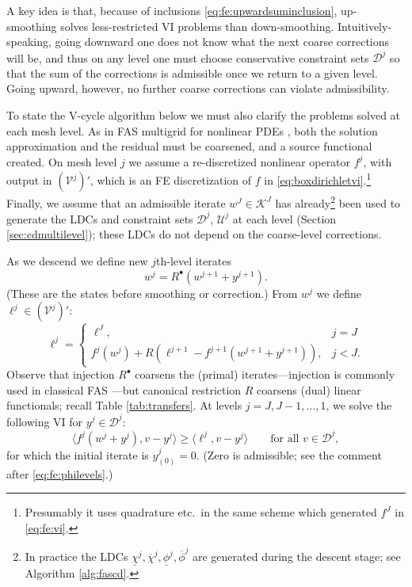 \documentclass[letterpaper,final,12pt,reqno]{amsart}
\theoremstyle{cstyle}
\theoremstyle{cstyle*}
\theoremstyle{dstyle}
\numberwithin{equation}{section}
\numberwithin{figure}{section}
\numberwithin{table}{section}
\numberwithin{theorem}{section}
\newcommand{\cV}{\mathcal{V}}
\newcommand{\ip}[2]{\langle#1,#2\rangle}
\newcommand{\iR}{R^{\bullet}}
\begin{document}
A key idea is that, because of inclusions \eqref{eq:fe:upwardsuminclusion}, up-smoothing solves less-restricted VI problems than down-smoothing.  Intuitively-speaking, going downward one does not know what the next coarse corrections will be, and thus on any level one must choose conservative constraint sets $\mathcal{D}^j$ so that the sum of the corrections is admissible once we return to a given level.  Going upward, however, no further coarse corrections can violate admissibility.

To state the V-cycle algorithm below we must also clarify the problems solved at each mesh level.  As in FAS multigrid for nonlinear PDEs \cite{BrandtLivne2011,Bruneetal2015,Trottenbergetal2001}, both the solution approximation and the residual must be coarsened, and a source functional created.  On mesh level $j$ we assume a re-discretized nonlinear operator $f^j$, with output in $(\cV^j)'$, which is an FE discretization of $f$ in \eqref{eq:boxdirichletvi}.\footnote{Presumably it uses quadrature etc.~in the same scheme which generated $f^J$ in \eqref{eq:fe:vi}.}  Finally, we assume that an admissible iterate $w^J \in \mathcal{K}^J$ has already\footnote{In practice the LDCs $\underline{\chi}^j,\overline{\chi}^j,\underline{\phi}^j,\overline{\phi}^j$ are generated during the descent stage; see Algorithm \ref{alg:fascd}.} been used to generate the LDCs and constraint sets $\mathcal{D}^j$, $\mathcal{U}^j$ at each level (Section \ref{sec:cdmultilevel}); these LDCs do not depend on the coarse-level corrections.

As we descend we define new $j$th-level iterates
\begin{equation}
w^j = \iR(w^{j+1} + y^{j+1}).  \label{eq:fe:definew}
\end{equation}
(These are the states before smoothing or correction.)  From $w^j$ we define $\ell^j \in (\cV^j)'$:
\begin{equation}
\ell^j = \begin{cases} \ell^J, & j=J \\
                       f^j(w^j) + R\left(\ell^{j+1}-f^{j+1}(w^{j+1}+y^{j+1})\right), & j<J. \end{cases} \label{eq:fe:levelsource}
\end{equation}
Observe that injection $\iR$ coarsens the (primal) iterates---injection is commonly used in classical FAS \cite[section 5.3]{Trottenbergetal2001}---but canonical restriction $R$ coarsens (dual) linear functionals; recall Table \ref{tab:transfers}.  At levels $j=J,J-1,\dots,1$, we solve the following VI for $y^j \in \mathcal{D}^j$:
\begin{equation}
\ip{f^j(w^j + y^j)}{v-y^j} \ge \ip{\ell^j}{v-y^j} \qquad \text{for all } v\in \mathcal{D}^j, \label{eq:fe:downvi}
\end{equation}
for which the initial iterate is $y_{(0)}^j=0$.  (Zero is admissible; see the comment after \eqref{eq:fe:philevels}.)
\end{document}
